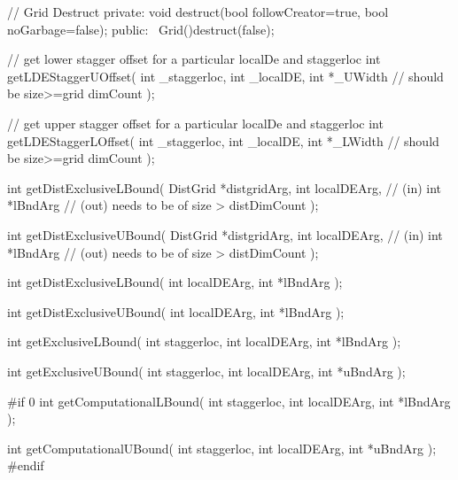 {{   // Grid Destruct
  private:
   void destruct(bool followCreator=true, bool noGarbage=false);
  public:
   ~Grid(){destruct(false);}
 
   // get lower stagger offset for a particular localDe and staggerloc
   int getLDEStaggerUOffset(
                int _staggerloc,
                int _localDE, 
                int *_UWidth // should be size>=grid dimCount
                );
 
   // get upper stagger offset for a particular localDe and staggerloc
   int getLDEStaggerLOffset(
              int _staggerloc,
              int _localDE, 
              int *_LWidth // should be size>=grid dimCount
              );
 
 
 
 int getDistExclusiveLBound(
                                  DistGrid *distgridArg, 
                                  int localDEArg,     // (in)
                                  int *lBndArg      // (out) needs to be of size > distDimCount
                                  );
 
 int getDistExclusiveUBound(
                                  DistGrid *distgridArg, 
                                  int localDEArg,     // (in)
                                  int *lBndArg      // (out) needs to be of size > distDimCount
                                  );
 
 
 
 int getDistExclusiveLBound(
                            int localDEArg, 
                            int *lBndArg    
                            );
 
 
 int getDistExclusiveUBound(
                            int localDEArg, 
                            int *lBndArg    
                            );
 
 int getExclusiveLBound(
                        int staggerloc,
                        int localDEArg, 
                        int *lBndArg    
                        );
 
 int getExclusiveUBound(
                        int staggerloc,
                        int localDEArg, 
                        int *uBndArg    
                        );
 
 #if 0
 int getComputationalLBound(
                            int staggerloc, 
                            int localDEArg, 
                            int *lBndArg    
                            );
 
 int getComputationalUBound(
                            int staggerloc, 
                            int localDEArg, 
                            int *uBndArg    
                            );
 #endif
 
}}
